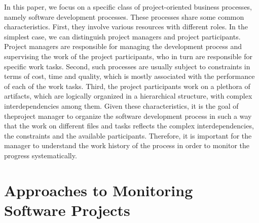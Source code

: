 In this paper, we focus on a specific class of project-oriented business processes,
namely software development processes. These processes share some common
characteristics. First, they involve various resources with different roles. In the
simplest case, we can distinguish project managers and project participants.
Project managers are responsible for managing the development process and
supervising the work of the project participants, who in turn are responsible for
specific work tasks. Second, such processes are usually subject to constraints in
terms of cost, time and quality, which is mostly associated with the performance
of each of the work tasks. Third, the project participants work on a plethora of
artifacts, which are logically organized in a hierarchical structure, with complex
interdependencies among them. Given these characteristics, it is the goal of theproject manager to organize the software development process in such a way
that the work on different files and tasks reflects the complex interdependencies,
the constraints and the available participants. Therefore, it is important for the
manager to understand the work history of the process in order to monitor the
progress systematically.

\section{Approaches to Monitoring Software Projects}



